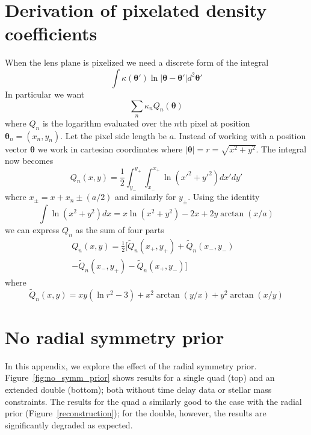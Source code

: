 \documentclass[galley,usenatbib]{mn2e}
\newcommand{\figref}[1] {Figure~\ref{#1}}
\renewcommand{\vec}[1]{\ensuremath{\boldsymbol{#1}}}
\begin{document}
\section{Derivation of pixelated density coefficients}
\label{Q derivation}
When the lens plane is pixelized we need a discrete form of the integral
%
\[\int \kappa(\vec\theta') \ln |\vec\theta-\vec\theta'| d^2\vec\theta' \]
%
In particular we want
%
\[\sum_n \kappa_n Q_n(\vec\theta)\]
%
where $Q_n$ is the logarithm evaluated over the $n$th pixel at position $\vec\theta_n = (x_n, y_n)$. Let the pixel side length be $a$.
Instead of working with a position vector $\vec\theta$ we work in cartesian coordinates where 
%
$|\vec\theta| = r = \sqrt{x^2 + y^2}$. The integral now becomes
%
\[Q_n(x,y) = \frac12 \int_{y_-}^{y_+}\int_{x_-}^{x_+} \ln (x'^2+y'^2) dx' dy'\]
%
where $x_\pm = x + x_n \pm (a/2)$ and similarly for $y_\pm$.
Using the identity
%
\[\int \ln(x^2+y^2) dx = x \ln(x^2+y^2) - 2x + 2y\arctan(x/a) \]
%
we can express $Q_n$ as the sum of four parts
%
\begin{align*}
Q_n(x,y) = \frac12 [\tilde Q_n(x_+,y_+)
                  + \tilde Q_n(x_-,y_-) & 
\\                - \tilde Q_n(x_-,y_+)
                  - \tilde Q_n(x_+,y_-) ]
\end{align*}
%
where
%
\[\tilde Q_n(x,y) = xy(\ln r^2 - 3) + x^2\arctan(y/x) + y^2\arctan(x/y)\]

\section{No radial symmetry prior}\label{no_symm_prior}

In this appendix, we explore the effect of the radial symmetry prior. \figref{fig:no_symm_prior} shows results for a single quad (top) and an extended double (bottom); both without time delay data or stellar mass constraints. The results for the quad a similarly good to the case with the radial prior (\figref{reconstruction}); for the double, however, the results are significantly degraded as expected.
\end{document}
